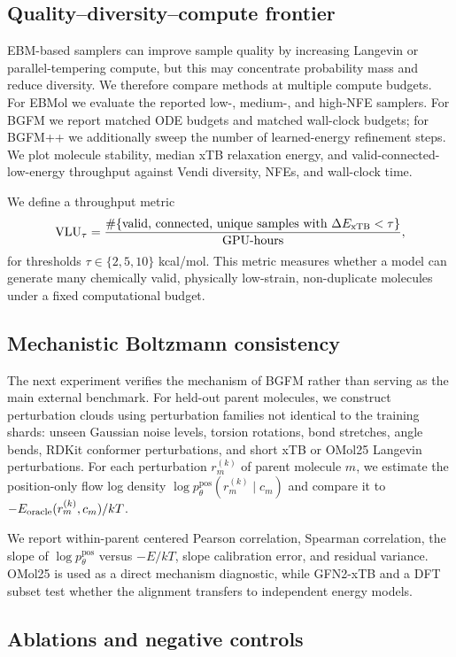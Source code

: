 \subsection{Quality--diversity--compute frontier}

EBM-based samplers can improve sample quality by increasing Langevin or parallel-tempering compute, but this may concentrate probability mass and reduce diversity. We therefore compare methods at multiple compute budgets. For EBMol we evaluate the reported low-, medium-, and high-NFE samplers. For BGFM we report matched ODE budgets and matched wall-clock budgets; for BGFM++ we additionally sweep the number of learned-energy refinement steps. We plot molecule stability, median xTB relaxation energy, and valid-connected-low-energy throughput against Vendi diversity, NFEs, and wall-clock time.

We define a throughput metric
\[
\mathrm{VLU}_{\tau} = \frac{\#\{\text{valid, connected, unique samples with } \Delta E_{\rm xTB}<\tau\}}{\text{GPU-hours}},
\]
for thresholds $\tau\in\{2,5,10\}$ kcal/mol. This metric measures whether a model can generate many chemically valid, physically low-strain, non-duplicate molecules under a fixed computational budget.

\subsection{Mechanistic Boltzmann consistency}

The next experiment verifies the mechanism of BGFM rather than serving as the main external benchmark. For held-out parent molecules, we construct perturbation clouds using perturbation families not identical to the training shards: unseen Gaussian noise levels, torsion rotations, bond stretches, angle bends, RDKit conformer perturbations, and short xTB or OMol25 Langevin perturbations. For each perturbation $r_m^{(k)}$ of parent molecule $m$, we estimate the position-only flow log density $\log p_\theta^{\mathrm{pos}}(r_m^{(k)}\mid c_m)$ and compare it to $-E_{\rm oracle}(r_m^{(k)},c_m)/kT$.

We report within-parent centered Pearson correlation, Spearman correlation, the slope of $\log p_\theta^{\mathrm{pos}}$ versus $-E/kT$, slope calibration error, and residual variance. OMol25 is used as a direct mechanism diagnostic, while GFN2-xTB and a DFT subset test whether the alignment transfers to independent energy models.

\subsection{Ablations and negative controls}

